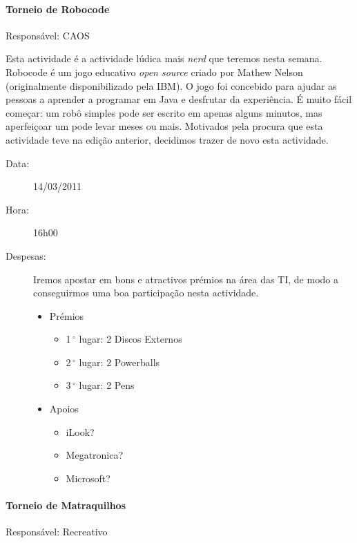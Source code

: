 \paragraph{Torneio de Robocode}
Responsável: CAOS

Esta actividade é a actividade lúdica mais \emph{nerd} que teremos nesta semana.
Robocode é um jogo educativo \emph{open source} criado por Mathew Nelson (originalmente disponibilizado pela IBM).
O jogo foi concebido para ajudar as pessoas a aprender a programar em Java e desfrutar da experiência. É muito fácil começar: um robô simples pode ser escrito em apenas alguns minutos, mas aperfeiçoar um pode levar meses ou mais.
Motivados pela procura que esta actividade teve na edição anterior, decidimos trazer de novo esta actividade.

\begin{description}
	\item[Data:] 14/03/2011
 	\item[Hora:] 16h00
\end{description}

\begin{description}
	\item[Despesas:] Iremos apostar em bons e atractivos prémios na área das TI, de modo a conseguirmos uma boa participação nesta actividade.
	\begin{itemize}
		\item Prémios
		\begin{itemize}
			\item 1$\,^{\circ}$ lugar: 2 Discos Externos
			\item 2$\,^{\circ}$ lugar: 2 Powerballs
			\item 3$\,^{\circ}$ lugar: 2 Pens
		\end{itemize}
		\item Apoios
		\begin{itemize}
			\item iLook?
			\item Megatronica?
			\item Microsoft?
		\end{itemize}
	\end{itemize}
\end{description}


\paragraph{Torneio de Matraquilhos}
Responsável: Recreativo

